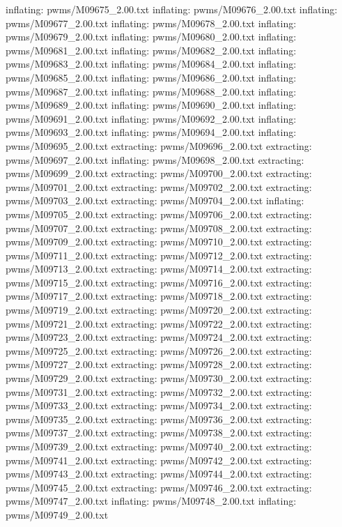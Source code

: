 \documentclass[letterpaper,10pt,english]{sphinxmanual}
\begin{document}
{\begin{sphinxVerbatim}[commandchars=\\\{\}]
  inflating: pwms/M09675\_2.00.txt
  inflating: pwms/M09676\_2.00.txt
  inflating: pwms/M09677\_2.00.txt
  inflating: pwms/M09678\_2.00.txt
  inflating: pwms/M09679\_2.00.txt
  inflating: pwms/M09680\_2.00.txt
  inflating: pwms/M09681\_2.00.txt
  inflating: pwms/M09682\_2.00.txt
  inflating: pwms/M09683\_2.00.txt
  inflating: pwms/M09684\_2.00.txt
  inflating: pwms/M09685\_2.00.txt
  inflating: pwms/M09686\_2.00.txt
  inflating: pwms/M09687\_2.00.txt
  inflating: pwms/M09688\_2.00.txt
  inflating: pwms/M09689\_2.00.txt
  inflating: pwms/M09690\_2.00.txt
  inflating: pwms/M09691\_2.00.txt
  inflating: pwms/M09692\_2.00.txt
  inflating: pwms/M09693\_2.00.txt
  inflating: pwms/M09694\_2.00.txt
  inflating: pwms/M09695\_2.00.txt
 extracting: pwms/M09696\_2.00.txt
 extracting: pwms/M09697\_2.00.txt
  inflating: pwms/M09698\_2.00.txt
 extracting: pwms/M09699\_2.00.txt
 extracting: pwms/M09700\_2.00.txt
 extracting: pwms/M09701\_2.00.txt
 extracting: pwms/M09702\_2.00.txt
 extracting: pwms/M09703\_2.00.txt
 extracting: pwms/M09704\_2.00.txt
  inflating: pwms/M09705\_2.00.txt
 extracting: pwms/M09706\_2.00.txt
 extracting: pwms/M09707\_2.00.txt
 extracting: pwms/M09708\_2.00.txt
 extracting: pwms/M09709\_2.00.txt
 extracting: pwms/M09710\_2.00.txt
 extracting: pwms/M09711\_2.00.txt
 extracting: pwms/M09712\_2.00.txt
 extracting: pwms/M09713\_2.00.txt
 extracting: pwms/M09714\_2.00.txt
 extracting: pwms/M09715\_2.00.txt
 extracting: pwms/M09716\_2.00.txt
 extracting: pwms/M09717\_2.00.txt
 extracting: pwms/M09718\_2.00.txt
 extracting: pwms/M09719\_2.00.txt
 extracting: pwms/M09720\_2.00.txt
 extracting: pwms/M09721\_2.00.txt
 extracting: pwms/M09722\_2.00.txt
 extracting: pwms/M09723\_2.00.txt
 extracting: pwms/M09724\_2.00.txt
 extracting: pwms/M09725\_2.00.txt
 extracting: pwms/M09726\_2.00.txt
 extracting: pwms/M09727\_2.00.txt
 extracting: pwms/M09728\_2.00.txt
 extracting: pwms/M09729\_2.00.txt
 extracting: pwms/M09730\_2.00.txt
 extracting: pwms/M09731\_2.00.txt
 extracting: pwms/M09732\_2.00.txt
 extracting: pwms/M09733\_2.00.txt
 extracting: pwms/M09734\_2.00.txt
 extracting: pwms/M09735\_2.00.txt
 extracting: pwms/M09736\_2.00.txt
 extracting: pwms/M09737\_2.00.txt
 extracting: pwms/M09738\_2.00.txt
 extracting: pwms/M09739\_2.00.txt
 extracting: pwms/M09740\_2.00.txt
 extracting: pwms/M09741\_2.00.txt
 extracting: pwms/M09742\_2.00.txt
 extracting: pwms/M09743\_2.00.txt
 extracting: pwms/M09744\_2.00.txt
 extracting: pwms/M09745\_2.00.txt
 extracting: pwms/M09746\_2.00.txt
 extracting: pwms/M09747\_2.00.txt
  inflating: pwms/M09748\_2.00.txt
  inflating: pwms/M09749\_2.00.txt

\end{sphinxVerbatim}}
\end{document}
